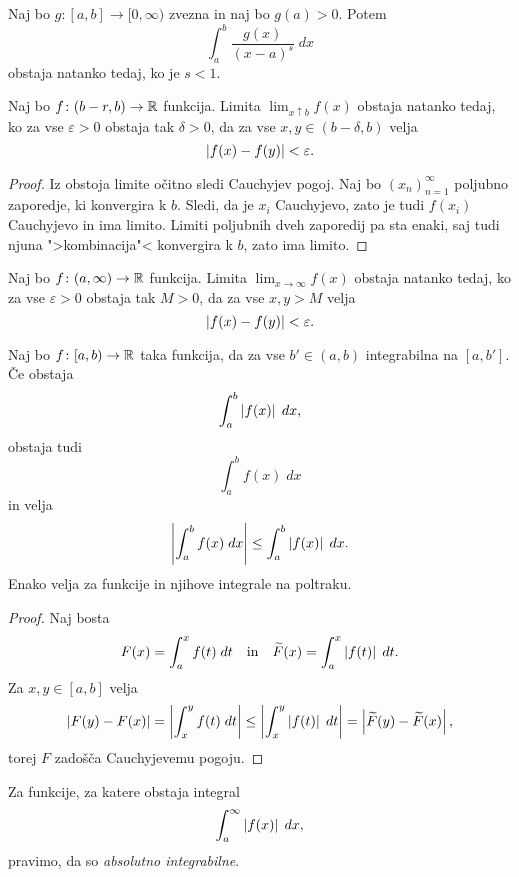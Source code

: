 \documentclass[12pt, a4paper]{article}
\begin{document}
\obvs

\begin{trditev}
Naj bo $g\colon[a,b]\to[0,\infty)$ zvezna in naj bo $g(a)>0$. Potem
\[
\int_a^b \frac{g(x)}{(x-a)^s}\;dx
\]
obstaja natanko tedaj, ko je $s<1$.
\end{trditev}


\begin{trditev}
Naj bo $f\colon(b-r,b)\to\mathbb{R}$ funkcija. Limita $\displaystyle\lim_{x\uparrow b} f(x)$ obstaja natanko tedaj, ko za vse $\varepsilon>0$ obstaja tak $\delta>0$, da za vse $x,y\in(b-\delta, b)$ velja
\[
\left\lvert f(x)-f(y)\right\rvert<\varepsilon.
\]
\end{trditev}

\begin{proof}
Iz obstoja limite očitno sledi Cauchyjev pogoj. Naj bo $(x_n)_{n=1}^\infty$ poljubno zaporedje, ki konvergira k $b$. Sledi, da je $x_i$ Cauchyjevo, zato je tudi $f(x_i)$ Cauchyjevo in ima limito. Limiti poljubnih dveh zaporedij pa sta enaki, saj tudi njuna ">kombinacija"< konvergira k $b$, zato ima limito.
\end{proof}

\begin{trditev}
Naj bo $f\colon(a,\infty)\to\mathbb{R}$ funkcija. Limita $\displaystyle\lim_{x\to\infty} f(x)$ obstaja natanko tedaj, ko za vse $\varepsilon>0$ obstaja tak $M>0$, da za vse $x,y>M$ velja
\[
\left\lvert f(x)-f(y)\right\rvert<\varepsilon.
\]
\end{trditev}

\begin{trditev}
Naj bo $f\colon[a,b)\to\mathbb{R}$ taka funkcija, da za vse $b'\in(a,b)$ integrabilna na $[a,b']$. Če obstaja
\[
\int_a^b\left\lvert f(x)\right\rvert\;dx,
\]
obstaja tudi
\[
\int_a^b f(x)\;dx
\]
in velja
\[
\left\lvert \int_a^b f(x)\;dx\right\rvert\leq \int_a^b\left\lvert f(x)\right\rvert\;dx.
\]
Enako velja za funkcije in njihove integrale na poltraku.
\end{trditev}

\begin{proof}
Naj bosta
\[
F(x)=\int_a^x f(t)\;dt\quad\text{in}\quad \widetilde{F}(x)=\int_a^x \left\lvert f(t)\right\rvert\;dt.
\]
Za $x,y\in[a,b]$ velja
\[
\left\lvert F(y)-F(x)\right\rvert=\left\lvert \int_x^y f(t)\;dt\right\rvert\leq\left\lvert \int_x^y \left\lvert f(t)\right\rvert\;dt\right\rvert=\left\lvert \widetilde{F}(y)-\widetilde{F}(x)\right\rvert,
\]
torej $F$ zadošča Cauchyjevemu pogoju.
\end{proof}

\begin{opomba}
Za funkcije, za katere obstaja integral
\[
\int_a^\infty \left\lvert f(x)\right\rvert\;dx,
\]
pravimo, da so \emph{absolutno integrabilne}.
\end{opomba}
\end{document}

